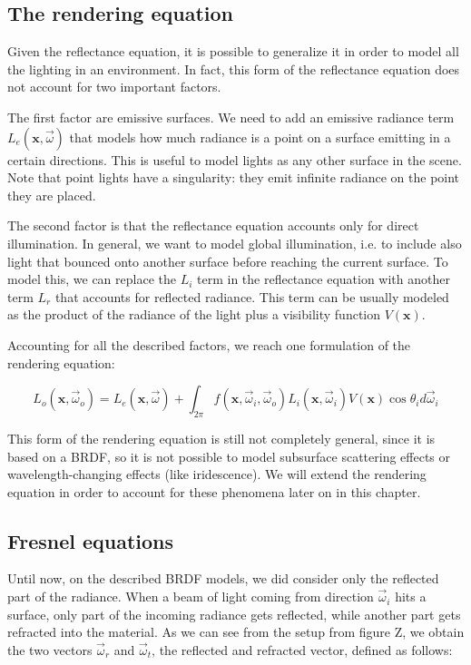 \subsection{The rendering equation}

Given the reflectance equation, it is possible to generalize it in order to model all the lighting in an environment. In fact, this form of the reflectance equation does not account for two important factors. 

The first factor are emissive surfaces. We need to add an emissive radiance term $L_e(\mathbf{x}, \vec{\omega})$ that models how much radiance is a point on a surface emitting in a certain directions. This is useful to model lights as any other surface in the scene. Note that point lights have a singularity: they emit infinite radiance on the point they are placed.

The second factor is that the reflectance equation accounts only for direct illumination. In general, we want to model global illumination, i.e. to include also light that bounced onto another surface before reaching the current surface. To model this, we can replace the $L_i$ term in the reflectance equation with another term $L_r$ that accounts for reflected radiance. This term can be usually modeled as the product of the radiance of the light plus a visibility function $V(\mathbf{x})$.

Accounting for all the described factors, we reach one formulation of the rendering equation:

$$
L_o(\mathbf{x}, \vec{\omega}_o) = L_e(\mathbf{x}, \vec{\omega}) + \int_{2\pi} f(\mathbf{x}, \vec{\omega}_i, \vec{\omega}_o) L_i(\mathbf{x}, \vec{\omega}_i) V(\mathbf{x}) \cos\theta_i d\vec{\omega}_i
$$

This form of the rendering equation is still not completely general, since it is based on a BRDF, so it is not possible to model subsurface scattering effects or wavelength-changing effects (like iridescence). We will extend the rendering equation in order to account for these phenomena later on in this chapter.

\subsection{Fresnel equations}

Until now, on the described BRDF models, we did consider only the reflected part of the radiance. When a beam of light coming from direction $\vec{\omega}_i$ hits a surface, only part of the incoming radiance gets reflected, while another part gets refracted into the material. As we can see from the setup from figure Z, we obtain the two vectors $\vec{\omega}_r$ and $\vec{\omega}_t$, the reflected and refracted vector, defined as follows:


